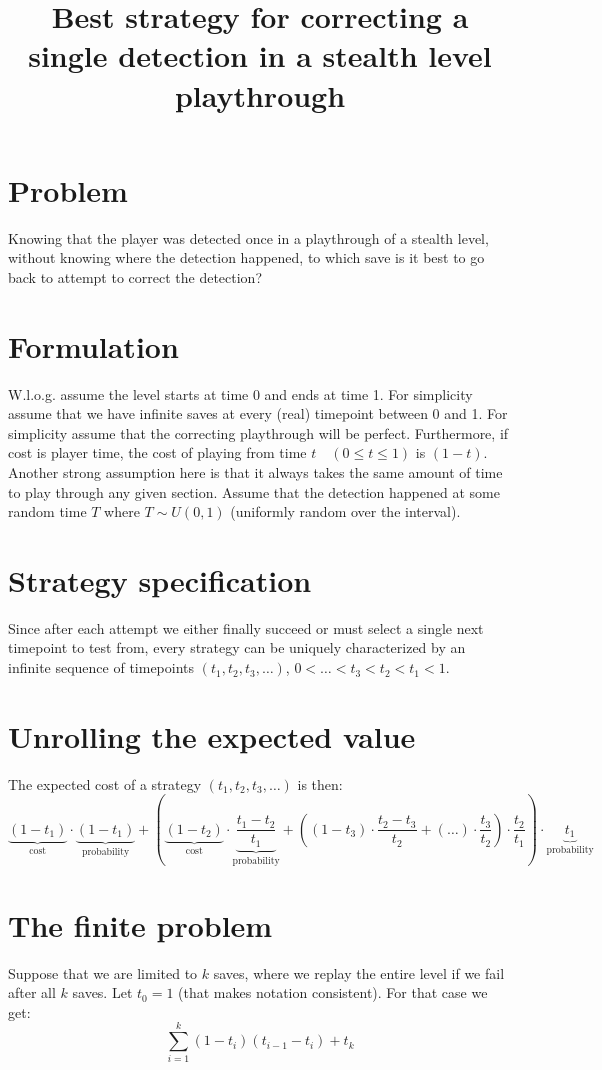 \documentclass{article}
\title{Best strategy for correcting a single detection in a stealth level playthrough}
\begin{document}
\maketitle

\section{Problem}
Knowing that the player was detected once in a playthrough of a stealth level, without knowing where the detection happened, to which save is it best to go back to attempt to correct the detection?

\section{Formulation}
W.l.o.g. assume the level starts at time 0 and ends at time 1.
For simplicity assume that we have infinite saves at every (real) timepoint between 0 and 1.
For simplicity assume that the correcting playthrough will be perfect.
Furthermore, if cost is player time, the cost of playing from time $t \quad (0\leq t \leq1)$ is $(1-t)$.
Another strong assumption here is that it always takes the same amount of time to play through any given section.
Assume that the detection happened at some random time $T$ where $T \sim U(0,1)$ (uniformly random over the interval).

\section{Strategy specification}
Since after each attempt we either finally succeed or must select a single next timepoint to test from, every strategy can be uniquely characterized by an infinite sequence of timepoints $(t_1, t_2, t_3, \ldots )$, $0 < \ldots < t_3 < t_2 < t_1 < 1$.

\section{Unrolling the expected value}
The expected cost of a strategy $(t_1, t_2, t_3, \ldots )$ is then:
\[
 \underbrace{(1 - t_1)}_{\text{cost}} \cdot \underbrace{(1 - t_1)}_{\text{probability}} +
 \left(
  \underbrace{(1 - t_2)}_{\text{cost}} \cdot \underbrace{\frac{t_1 - t_2}{t_1}}_{\text{probability}} +
  \left( (1-t_3) \cdot \frac{t_2-t_3}{t_2} + (\ldots)\cdot \frac{t_3}{t_2}
  \right) \cdot \frac{t_2}{t_1}
 \right) \cdot \underbrace{t_1}_{\text{probability}}
\]

\section{The finite problem}
Suppose that we are limited to $k$ saves, where we replay the entire level if we fail after all $k$ saves.
Let $t_0=1$ (that makes notation consistent).
For that case we get:
\begin{equation}\label{eq:finite}
\sum_{i=1}^k (1-t_i) (t_{i-1} - {t_i}) + t_k
\end{equation}
\end{document}
